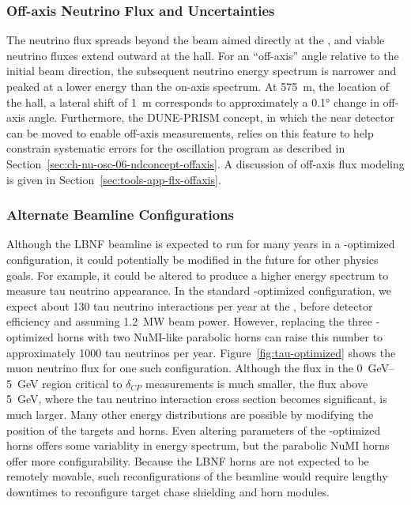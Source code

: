 \subsubsection{Off-axis Neutrino Flux and Uncertainties}

The neutrino flux spreads beyond the beam aimed directly at the , and viable neutrino fluxes extend outward at the  hall.  For an ``off-axis'' angle relative to the initial beam direction, the subsequent neutrino energy spectrum is narrower and peaked at a lower energy than the on-axis spectrum. At \SI{575}{m}, the location of the  hall, a lateral shift of \SI{1}{m} corresponds to approximately a \ang{0.1} change in off-axis angle.  Furthermore, the DUNE-PRISM concept, in which the near detector \lartpc %
can be moved to enable  off-axis measurements, relies on this feature to help constrain systematic errors for the  oscillation program as described in Section~\ref{sec:ch-nu-osc-06-ndconcept-offaxis}. A discussion of off-axis flux modeling is given in %
Section~\ref{sec:tools-app-flx-offaxis}.

\subsubsection{Alternate Beamline Configurations}

Although the LBNF beamline is expected to run for many years in a -optimized configuration, it could potentially be modified in the future for other physics goals.  For example, it could be altered to produce a higher energy spectrum %
to measure tau neutrino appearance.  In the standard -optimized configuration, we expect about 130 tau neutrino  interactions per year %
at the , before detector efficiency and assuming \SI{1.2}{MW} beam power.  However, replacing the three -optimized horns with two NuMI-like parabolic horns can raise this number to approximately \num{1000} tau neutrinos per year.  Figure~\ref{fig:tau-optimized} shows the muon neutrino flux for one such configuration.  Although the flux in the \SIrange{0}{5}{\GeV} region critical to $\delta_{CP}$ measurements is much smaller, the flux above \SI{5}{\GeV}, where the tau neutrino interaction cross section becomes significant, is much larger.  Many other energy distributions are possible by modifying the position of the targets and horns.  Even altering parameters of the -optimized horns offers some variablity in energy spectrum, but the parabolic NuMI horns offer more configurability.  Because the LBNF horns are not expected to be remotely movable, such reconfigurations of the beamline would require lengthy downtimes to reconfigure target chase shielding and horn modules.   

